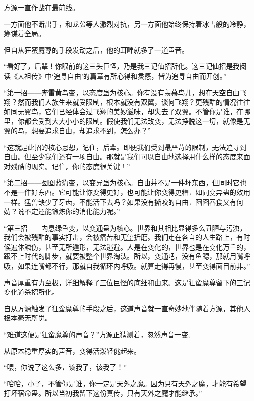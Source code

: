 
\begin{this_body}

方源一直作战在最前线。

一方面他不断出手，和龙公等人激烈对抗，另一方面他始终保持着冰雪般的冷静，筹谋着全局。

但自从狂蛮魔尊的手段发动之后，他的耳畔就多了一道声音。

“看好了，后辈！你眼前的这三头巨怪，乃是我三记仙招所化。这三记仙招是我阅读《人祖传》中‘追寻自由’的篇章有所心得和灵感，皆为追寻自由而开创。”

“第一招——奔雷黄鸟变，以态度蛊为核心。你有没有羡慕鸟儿，想在天空自由飞翔？然而我们人族生来就受限制，根本就没有双翼，谈何飞翔？更残酷的情况往往如同无翼鸟，它们已经体会过飞翔的美妙滋味，却失去了双翼。不管你是谁，在哪里，你都会受到大大小小的限制。假使我们无法改变，无法挣脱这一切，就像是无翼的鸟，想要追求自由，却追求不到，怎么办？”

“这就是此招的核心思想，记住，后辈。即便我们受到最严苛的限制，无法追寻到自由。但至少我们还有一项自由。那就是我们可以自由地选择用什么样的态度来面对残酷的现实。记住，你的态度很关键！”

“第二招——囫囵蓝豹变，以变异蛊为核心。自由并不是一件坏东西，但同时它也不是一件好东西。它可能让你变得更好，也可能让你变得更糟，如同变异蛊的效用一样。猛兽缺少了牙齿，不能活下去吗？如果没有撕咬的自由，囫囵吞食又有何妨？说不定还能锻炼你的消化能力呢。”

“第三招——内息绿鱼变，以变通蛊为核心。世界和其相比显得多么丑陋与污浊，我们会被残酷的事实打击，会被痛苦和无望折磨。我们走在各自的人生路上，有时候遍体鳞伤，甚至无所遁形，无法逃避。人是在变化的，世界也是在变化万千的，跟不上时代的脚步，就要被整个世界淘汰。所以，变通吧，没有鱼鳃，那就用嘴呼吸，如果连嘴都不行，那就自我循环内呼吸。就算走得再慢，甚至变得面目前非。”

声音厚重有力至极，详细解释了三位巨怪的底细和由来。这是狂蛮魔尊留下的三记变化道杀招所化。

自从方源触发了狂蛮魔尊的手段之后，这道声音就一直奇妙地伴随着方源，其他人根本毫无所觉。

“难道这便是狂蛮魔尊的声音？”方源正猜测着，忽然声音一变。

从原本稳重厚实的声音，变得活泼轻佻起来。

“喂，你说了这么多，该我了，该我了！”

“哈哈，小子，不管你是谁，你一定是天外之魔。因为只有天外之魔，才能有希望打坏宿命蛊。所以当初我留下这份真传，只有天外之魔才能继承。”


\end{this_body}
